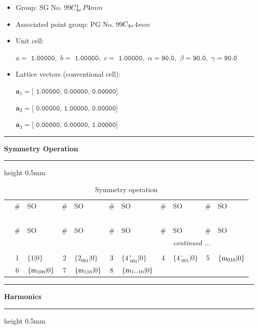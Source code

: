 \documentclass[fleqn,10pt,landscape]{jsarticle}
\begin{document}
\begin{itemize}
\item Group: SG No. 99\quad$C_{\rm 4v}^{1}$\quad$P4mm$\quad[ tetragonal ]
\item Associated point group: PG No. 99\quad$C_{\rm 4v}$\quad$4mm$\quad[ tetragonal ]
\end{itemize}
\begin{itemize}
\item Unit cell:

\quad $a=\texttt{ 1.00000},\,\, b=\texttt{ 1.00000},\,\, c=\texttt{ 1.00000},\,\, \alpha=\texttt{90.0},\,\, \beta=\texttt{90.0},\,\, \gamma=\texttt{90.0}$

\item Lattice vectors (conventional cell):

\quad $\bm{a}_1=\texttt{[ 1.00000, 0.00000, 0.00000]}$

\quad $\bm{a}_2=\texttt{[ 0.00000, 1.00000, 0.00000]}$

\quad $\bm{a}_3=\texttt{[ 0.00000, 0.00000, 1.00000]}$

\end{itemize}
\vspace{5mm}
\noindent \rule[0.5mm]{5mm}{0.5mm}\hspace{3mm}\textbf{Symmetry Operation}\hspace{3mm}\leaders\hrule height 0.5mm\hfill\kern0pt
\vspace{3mm}

\renewcommand{\arraystretch}{1.6}
\begin{longtable}[l]{c|cl|cl|cl|cl|cl}
\captionsetup{justification=raggedright, singlelinecheck=off}
\caption{Symmetry operation}
 \\
 \hline \hline
 & \# & SO & \# & SO & \# & SO & \# & SO & \# & SO \\ \hline \endfirsthead

\multicolumn{10}{l}{\tablename\ \thetable{}} \\
 \hline \hline
 & \# & SO & \# & SO & \# & SO & \# & SO & \# & SO \\ \hline \endhead

 \hline \hline
\multicolumn{10}{r}{\footnotesize\it continued ...} \\ \endfoot

 \hline \hline
\multicolumn{10}{r}{} \\ \endlastfoot

 & 1 & $\{1|0\}$ & 2 & $\{2{}_{001}|0\}$ & 3 & $\{4^{+}_{\,\,001}|0\}$ & 4 & $\{4^{-}_{\,\,001}|0\}$ & 5 & $\{{\rm m}_{010}|0\}$ \\
& 6 & $\{{\rm m}_{100}|0\}$ & 7 & $\{{\rm m}_{110}|0\}$ & 8 & $\{{\rm m}_{1-10}|0\}$ &  &  &  &  \\
\end{longtable}
\vspace{5mm}
\noindent \rule[0.5mm]{5mm}{0.5mm}\hspace{3mm}\textbf{Harmonics}\hspace{3mm}\leaders\hrule height 0.5mm\hfill\kern0pt
\vspace{3mm}
\end{document}
